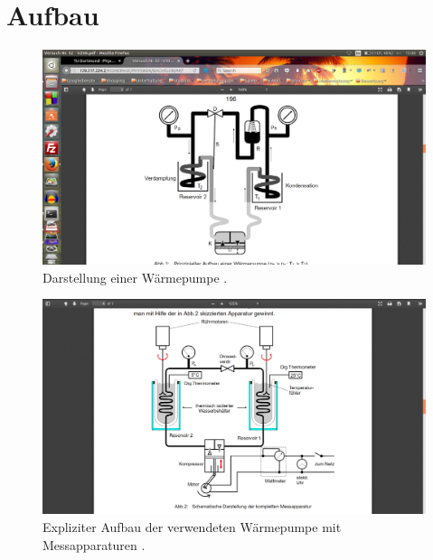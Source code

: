 \section{Aufbau}
\begin{figure}
	\centering
	\includegraphics[width=\linewidth-100pt,height=\textheight-100pt,keepaspectratio]{content/Bilder/Aufbau.png}
	\caption{Darstellung einer Wärmepumpe \cite{V206}.}
	\label{fig:Aufbau1}
\end{figure}
\begin{figure}
	\centering
	\includegraphics[width=\linewidth-100pt,height=\textheight-100pt,keepaspectratio]{content/Bilder/Aufbau2.png}
	\caption{Expliziter Aufbau der verwendeten Wärmepumpe mit Messapparaturen \cite{V206}.}
	\label{fig:Aufbau2}
\end{figure}